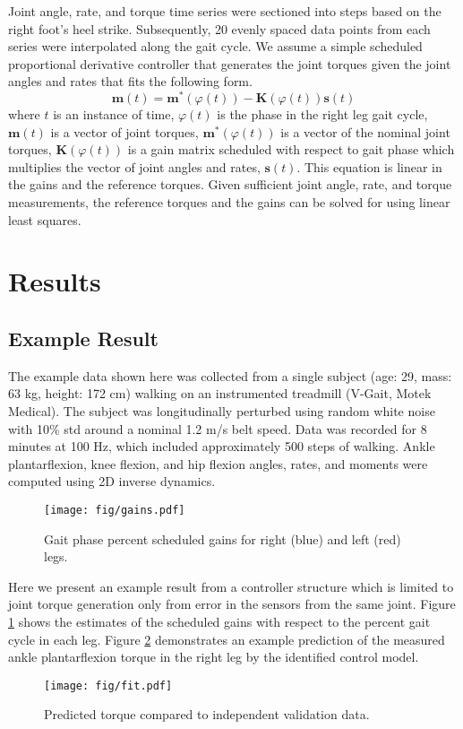 \documentclass{article}
\begin{document}
Joint angle, rate, and torque time series were sectioned into steps based on
the right foot's heel strike. Subsequently, 20 evenly spaced data points from
each series were interpolated along the gait cycle. We assume a simple
scheduled proportional derivative controller that generates the joint torques
given the joint angles and rates that fits the following form.
%
\begin{equation}
  \mathbf{m}(t) = \mathbf{m}^*(\varphi(t)) -
  \mathbf{K}(\varphi(t))\mathbf{s}(t)
\end{equation}
%
where $t$ is an instance of time, $\varphi(t)$ is the phase in the right leg
gait cycle, $\mathbf{m}(t)$ is a vector of joint torques,
$\mathbf{m}^*(\varphi(t))$ is a vector of the nominal joint torques,
$\mathbf{K}(\varphi(t))$ is a gain matrix scheduled with respect to gait
phase which multiplies the vector of joint angles and rates, $\mathbf{s}(t)$.
This equation is linear in the gains and the reference torques. Given
sufficient joint angle, rate, and torque measurements, the reference torques
and the gains can be solved for using linear least squares.

\section{Results}
%
\subsection{Example Result}
%
The example data shown here was collected from a single subject (age: 29, mass:
63 kg, height: 172 cm) walking on an instrumented treadmill (V-Gait, Motek
Medical). The subject was longitudinally perturbed using random white noise
with 10\% std around a nominal 1.2 m/s belt speed. Data was recorded for 8
minutes at 100 Hz, which included approximately 500 steps of walking. Ankle
plantarflexion, knee flexion, and hip flexion angles, rates, and moments were
computed using 2D inverse dynamics.
%
\begin{figure}[hbt]
  \begin{center}
    \texttt{[image: fig/gains.pdf]}
    \caption{Gait phase percent scheduled gains for right (blue) and left (red) legs.}
    \label{fig:gains}
  \end{center}
\end{figure}

Here we present an example result from a controller structure which is limited
to joint torque generation only from error in the sensors from the same joint.
Figure \ref{fig:gains} shows the estimates of the scheduled gains with respect
to the percent gait cycle in each leg. Figure \ref{fig:fit} demonstrates an
example prediction of the measured ankle plantarflexion torque in the right leg
by the identified control model.
%
\begin{figure}[b]
  \begin{center}
    \texttt{[image: fig/fit.pdf]}
    \caption{Predicted torque compared to independent validation data.}
    \label{fig:fit}
  \end{center}
\end{figure}
%
\end{document}

